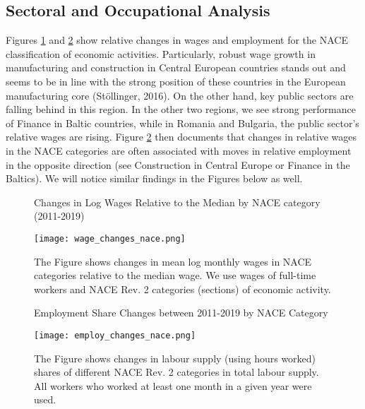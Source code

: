 \documentclass[11pt]{article}
\begin{document}
\subsection{Sectoral and Occupational Analysis}
Figures \ref{wage_changes_nace} and \ref{employ_changes_nace} show relative changes in wages and employment for the NACE classification of economic activities. Particularly, robust wage growth in manufacturing and construction in Central European countries stands out and seems to be in line with the strong position of these countries in the European manufacturing core (Stöllinger, 2016). On the other hand, key public sectors are falling behind in this region. In the other two regions, we see strong performance of Finance in Baltic countries, while in Romania and Bulgaria, the public sector's relative wages are rising. Figure \ref{employ_changes_nace} then documents that changes in relative wages in the NACE categories are often associated with moves in relative employment in the opposite direction (see Construction in Central Europe or Finance in the Baltics). We will notice similar findings in the Figures below as well.

\begin{figure}[!htbp]%
\centering
    \caption{Changes in Log Wages Relative to the Median by NACE category (2011-2019)}
    {\texttt{[image: wage\_changes\_nace.png]} }
    \caption*{\footnotesize The Figure shows changes in mean log monthly wages in NACE categories relative to the median wage. We use wages of full-time workers and NACE Rev. 2 categories (sections) of economic activity.}
\label{wage_changes_nace}
\end{figure}

\begin{figure}[!htbp]%
\centering
    \caption{Employment Share Changes between 2011-2019 by NACE Category}
    {\texttt{[image: employ\_changes\_nace.png]} }
    \caption*{\footnotesize The Figure shows changes in labour supply (using hours worked) shares of different NACE Rev. 2 categories in total labour supply. All workers who worked at least one month in a given year were used.}
\label{employ_changes_nace}
\end{figure}
\end{document}
